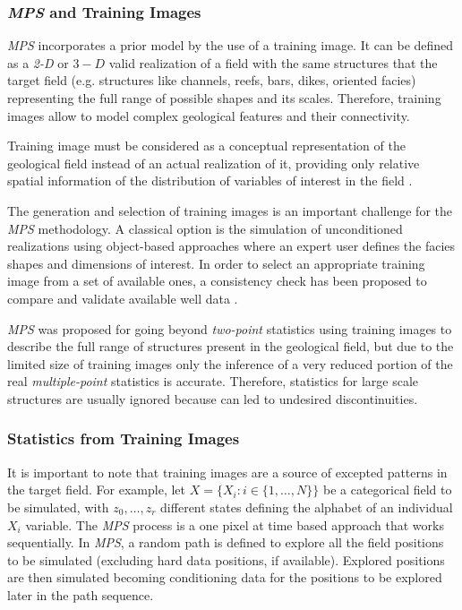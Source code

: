	
\subsubsection{\emph{MPS} and Training Images}
\label{sec_TrainingImages}

\emph{MPS} incorporates a prior model by the use of a training image. It can be defined as a \emph{2-D} or $3-D$ valid realization of a field with the same structures that the target field (e.g. structures like channels, reefs, bars, dikes, oriented facies) representing the full range of possible shapes and its scales. Therefore, training images allow to model complex geological features and their connectivity. 

Training image must be considered as a conceptual representation of the geological field instead of an actual realization of it, providing only relative spatial information of the distribution of variables of interest in the field \cite{Scheidt2009_a}.

The generation and selection of training images is an important challenge for the \emph{MPS} methodology. A classical option is the simulation of unconditioned realizations using object-based approaches where an expert user defines the facies shapes and dimensions of interest. In order to select an appropriate training image from a set of available ones, a consistency check has been proposed to compare and validate available well data \cite{Strebelle_2004a}.

\emph{MPS} was proposed for going beyond \emph{two-point} statistics \cite{Guardiano_1993_a} using training images to describe the full range of structures present in the geological field, but due to the limited size of training images only the inference of a very reduced portion of the real \emph{multiple-point} statistics is accurate. Therefore, statistics for large scale structures are usually ignored because can led to undesired discontinuities.

	
\subsubsection{Statistics from Training Images}
\label{sec_StatsTrainingImages}

It is important to note that training images are a source of excepted patterns in the target field. For example, let $X = \{ X_{i} : i \in \{1,\ldots, N\}  \}$ be a categorical field to be simulated, with $z_0, \ldots, z_r$ different states defining the alphabet of an individual $X_{i}$ variable. The \emph{MPS} process is a one pixel at time based approach that works sequentially. In \emph{MPS}, a random path is defined to explore all the field positions to be simulated (excluding hard data positions, if available). Explored positions are then simulated becoming conditioning data for the positions to be explored later in the path sequence.


